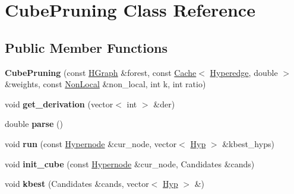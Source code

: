 \hypertarget{class_cube_pruning}{
\section{CubePruning Class Reference}
\label{class_cube_pruning}
}
\subsection*{Public Member Functions}
\begin{DoxyCompactItemize}
\item 
\hypertarget{class_cube_pruning_af17d9dda17f79a2c44b47501b9d99870}{
{\bfseries CubePruning} (const \hyperlink{class_scarab_1_1_h_g_1_1_h_graph}{HGraph} \&forest, const \hyperlink{class_cache}{Cache}$<$ \hyperlink{class_scarab_1_1_h_g_1_1_hyperedge}{Hyperedge}, double $>$ \&weights, const \hyperlink{class_non_local}{NonLocal} \&non\_\-local, int k, int ratio)}
\label{class_cube_pruning_af17d9dda17f79a2c44b47501b9d99870}

\item 
\hypertarget{class_cube_pruning_a0e8d07fc09d695095be5b70780db95d6}{
void {\bfseries get\_\-derivation} (vector$<$ int $>$ \&der)}
\label{class_cube_pruning_a0e8d07fc09d695095be5b70780db95d6}

\item 
\hypertarget{class_cube_pruning_adf80c0c689d075765f250649433833e4}{
double {\bfseries parse} ()}
\label{class_cube_pruning_adf80c0c689d075765f250649433833e4}

\item 
\hypertarget{class_cube_pruning_ab949710c0d8e552cbadbe837b1b62d47}{
void {\bfseries run} (const \hyperlink{class_scarab_1_1_h_g_1_1_hypernode}{Hypernode} \&cur\_\-node, vector$<$ \hyperlink{struct_hyp}{Hyp} $>$ \&kbest\_\-hyps)}
\label{class_cube_pruning_ab949710c0d8e552cbadbe837b1b62d47}

\item 
\hypertarget{class_cube_pruning_a14a4e797c638d07744dc328cf2ce568e}{
void {\bfseries init\_\-cube} (const \hyperlink{class_scarab_1_1_h_g_1_1_hypernode}{Hypernode} \&cur\_\-node, Candidates \&cands)}
\label{class_cube_pruning_a14a4e797c638d07744dc328cf2ce568e}

\item 
\hypertarget{class_cube_pruning_abe8c53bd14fe4ad98ff6388f38a849cb}{
void {\bfseries kbest} (Candidates \&cands, vector$<$ \hyperlink{struct_hyp}{Hyp} $>$ \&)}
\label{class_cube_pruning_abe8c53bd14fe4ad98ff6388f38a849cb}


\end{DoxyCompactItemize}
